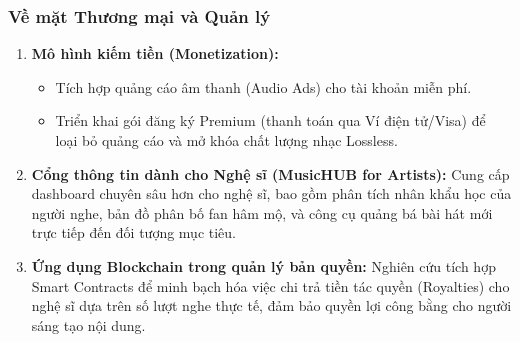 \documentclass[a4paper]{article}
\begin{document}
\subsubsection{Về mặt Thương mại và Quản lý}
\begin{enumerate}
    \item \textbf{Mô hình kiếm tiền (Monetization):}
    \begin{itemize}
        \item Tích hợp quảng cáo âm thanh (Audio Ads) cho tài khoản miễn phí.
        \item Triển khai gói đăng ký Premium (thanh toán qua Ví điện tử/Visa) để loại bỏ quảng cáo và mở khóa chất lượng nhạc Lossless.
    \end{itemize}
    
    \item \textbf{Cổng thông tin dành cho Nghệ sĩ (MusicHUB for Artists):}
    Cung cấp dashboard chuyên sâu hơn cho nghệ sĩ, bao gồm phân tích nhân khẩu học của người nghe, bản đồ phân bố fan hâm mộ, và công cụ quảng bá bài hát mới trực tiếp đến đối tượng mục tiêu.
    
    \item \textbf{Ứng dụng Blockchain trong quản lý bản quyền:}
    Nghiên cứu tích hợp Smart Contracts để minh bạch hóa việc chi trả tiền tác quyền (Royalties) cho nghệ sĩ dựa trên số lượt nghe thực tế, đảm bảo quyền lợi công bằng cho người sáng tạo nội dung.
\end{enumerate}
\end{document}
